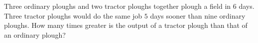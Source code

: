 Three ordinary ploughs and two tractor ploughs together plough a field in $6$ days. Three tractor ploughs would do the same job $5$ days sooner than nine ordinary ploughs. How many times greater is the output of a tractor plough than that of an ordinary plough?
